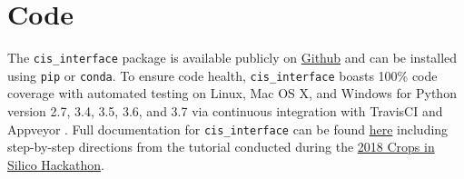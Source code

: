 \documentclass[journal]{IEEEtran}
\newcommand{\todo}[1]{{\color{red}{#1}}}
\newcommand{\cis}{{\tt cis\_interface}{}}
\begin{document}
\section*{Code}\label{S:code}
The {\cis} package is available publicly on \href{https://github.com/cropsinsilico/cis_interface}{Github} and can be 
installed using {\tt pip} or {\tt conda}. To ensure code health, {\cis} boasts 100\% code coverage with automated testing on Linux, Mac OS X, and Windows for Python version 2.7, 3.4, 3.5, 3.6, and 3.7 via continuous integration with TravisCI \citep{travisci} and Appveyor \citep{appveyor}. Full documentation for {\cis} can be found \href{https://cropsinsilico.github.io/cis_interface/}{here} including step-by-step directions from the tutorial conducted during the \href{https://cropsinsilico.github.io/cis_interface/hackathon2018/index.html}{2018 Crops in Silico Hackathon}.


\end{document}
